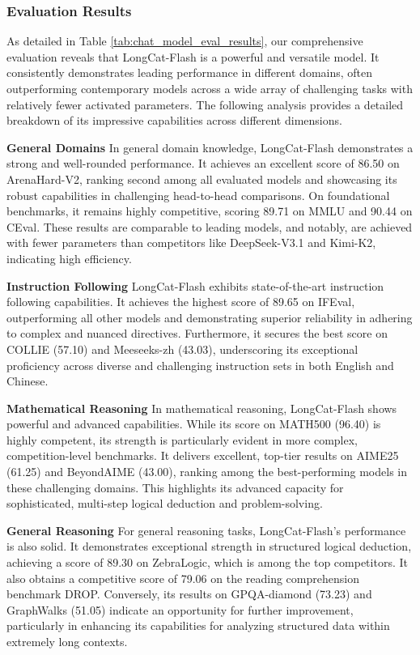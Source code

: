 \documentclass{article}
\newcommand{\longcat}{LongCat-Flash\xspace}
\begin{document}
\subsubsection{Evaluation Results}

As detailed in Table \ref{tab:chat_model_eval_results}, our comprehensive evaluation reveals that \longcat is a powerful and versatile model. It consistently demonstrates leading performance in different domains, often outperforming contemporary models across a wide array of challenging tasks with relatively fewer activated parameters. The following analysis provides a detailed breakdown of its impressive capabilities across different dimensions.

\textbf{General Domains}  In general domain knowledge, \longcat demonstrates a strong and well-rounded performance. It achieves an excellent score of 86.50 on ArenaHard-V2, ranking second among all evaluated models and showcasing its robust capabilities in challenging head-to-head comparisons. On foundational benchmarks, it remains highly competitive, scoring 89.71 on MMLU and 90.44 on CEval. These results are comparable to leading models, and notably, are achieved with fewer parameters than competitors like DeepSeek-V3.1 and Kimi-K2, indicating high efficiency.

\textbf{Instruction Following}  \longcat exhibits state-of-the-art instruction following capabilities. It achieves the highest score of 89.65 on IFEval, outperforming all other models and demonstrating superior reliability in adhering to complex and nuanced directives. Furthermore, it secures the best score on COLLIE (57.10) and Meeseeks-zh (43.03), underscoring its exceptional proficiency across diverse and challenging instruction sets in both English and Chinese.

\textbf{Mathematical Reasoning}  In mathematical reasoning, \longcat shows powerful and advanced capabilities. While its score on MATH500 (96.40) is highly competent, its strength is particularly evident in more complex, competition-level benchmarks. It delivers excellent, top-tier results on AIME25 (61.25) and BeyondAIME (43.00), ranking among the best-performing models in these challenging domains. This highlights its advanced capacity for sophisticated, multi-step logical deduction and problem-solving.

\textbf{General Reasoning}  For general reasoning tasks, \longcat's performance is also solid. It demonstrates exceptional strength in structured logical deduction, achieving a score of 89.30 on ZebraLogic, which is among the top competitors. It also obtains a competitive score of 79.06 on the reading comprehension benchmark DROP. Conversely, its results on GPQA-diamond (73.23) and GraphWalks (51.05) indicate an opportunity for further improvement, particularly in enhancing its capabilities for analyzing structured data within extremely long contexts.
\end{document}
